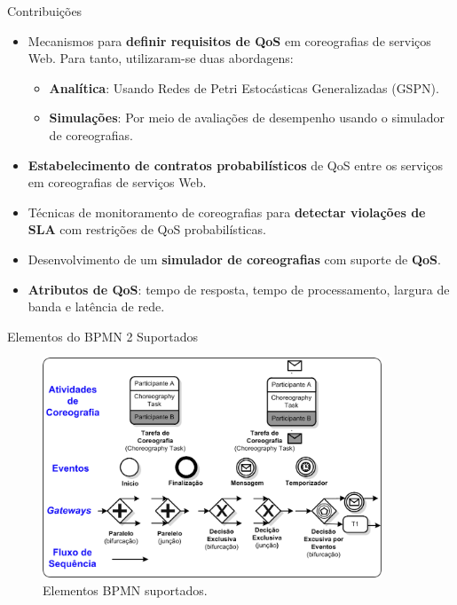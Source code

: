 \documentclass[xcolor=svgnames]{beamer}
\begin{document}
   \begin{frame}{Contribuições}

      \begin{itemize}
          \item <1-> Mecanismos para \textbf{definir requisitos de QoS} em coreografias de serviços Web. Para tanto, utilizaram-se duas abordagens:
             \begin{itemize}
                  \item <2->\textbf{Analítica}:  Usando Redes de Petri Estocásticas Generalizadas (GSPN).
                  \item <3->\textbf{Simulações}: Por meio de avaliações de desempenho usando o simulador de coreografias.
	    \end{itemize}

         \item <4-> \textbf{Estabelecimento de contratos  probabilísticos} de QoS entre os serviços em   coreografias de serviços Web.
	 \item <5-> Técnicas de monitoramento de coreografias para \textbf{detectar violações de SLA} com restrições de QoS probabilísticas.
	 \item <6->  Desenvolvimento de um \textbf{simulador de coreografias} com suporte de \textbf{QoS}.
	 \item <7->\textbf{Atributos de QoS}: tempo de resposta, tempo de processamento, largura de banda e latência de rede.
       \end{itemize}

   \end{frame}



  \begin{frame}{Elementos do BPMN 2 Suportados }
      \begin{figure}[!h]
	\centering
	\includegraphics[width=0.9\textwidth]{./figures/BPMNBasicChoroegraphy.png}
	\caption{Elementos BPMN suportados.}
	\label{fig:ChoreographyElements}
    \end{figure}

  \end{frame}
\end{document}
